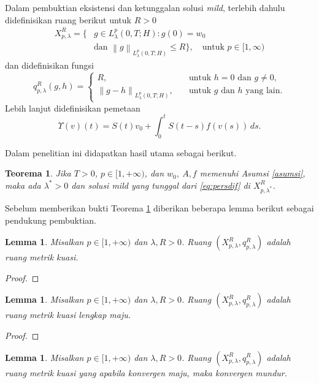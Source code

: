 \documentclass[journal]{IEEEtran}
\newtheorem{teo}[defn]{Teorema}
\newtheorem{lemmas}[defn]{Lemma}
\theoremstyle{definition}
\theoremstyle{definition}
\theoremstyle{plain}
\newcommand{\normlp}[1]{\left\|#1\right\|_{L^p_{\lambda}(0,T;H)}}%
\begin{document}
Dalam pembuktian eksistensi dan ketunggalan solusi \textit{mild}, terlebih dahulu didefinisikan ruang berikut untuk $R>0$
\begin{align*}
     X^R_{p,\lambda}=\{&g\in L^p_{\lambda}(0,T;H):g(0)=w_0 \\
    &\text{dan } \normlp{g}\leq R\}, \quad \text{untuk } p\in [1,\infty)
\end{align*}
dan didefinisikan fungsi 
\begin{equation*}
    q^R_{p,\lambda}(g,h)=\begin{cases} R, \quad &\text{untuk } h=0 \text{ dan } g\neq 0,\\
    \normlp{g-h}, \quad &\text{untuk } g \text{ dan } h \text{ yang lain}.
    \end{cases}
\end{equation*}
Lebih lanjut didefinisikan pemetaan
\begin{equation}
    \Upsilon(v)(t) = S(t)v_0 + \int_0^t S(t-s)f(v(s)) \, ds. \label{eq:pemetaanT}
\end{equation}

Dalam penelitian ini didapatkan hasil utama sebagai berikut.
\begin{teo}\label{thm:hasilaplikasi}
    Jika $T>0$, $p\in [1,+\infty)$, dan $w_0,~ A, f$ memenuhi Asumsi \ref{asumsi}, maka ada $\lambda^*>0$ dan solusi \textit{mild} yang tunggal dari \eqref{eq:persdif} di $X^R_{p,\lambda^*}$.
\end{teo}

Sebelum memberikan bukti Teorema \ref{thm:hasilaplikasi} diberikan beberapa lemma berikut sebagai pendukung pembuktian.
\begin{lemmas}
    Misalkan $p\in[1,+\infty)$ dan $\lambda, R>0$. Ruang $(X^R_{p,\lambda},q^R_{p,\lambda})$ adalah ruang metrik kuasi.
\end{lemmas}

\begin{proof}
\end{proof}

\begin{lemmas}\label{lemma:X_metrik_kuasi_lengkapmaju}
    Misalkan $p\in[1,+\infty)$ dan $\lambda, R>0$. Ruang $(X^R_{p,\lambda},q^R_{p,\lambda})$ adalah ruang metrik kuasi lengkap maju.
\end{lemmas}

\begin{proof}

\end{proof}

\begin{lemmas}\label{lemma:konvergen_maju-konvergen_mundur}
    Misalkan $p\in[1,+\infty)$ dan $\lambda, R>0$. Ruang $(X^R_{p,\lambda},q^R_{p,\lambda})$ adalah ruang metrik kuasi yang apabila konvergen maju, maka konvergen mundur.
\end{lemmas}
\end{document}
